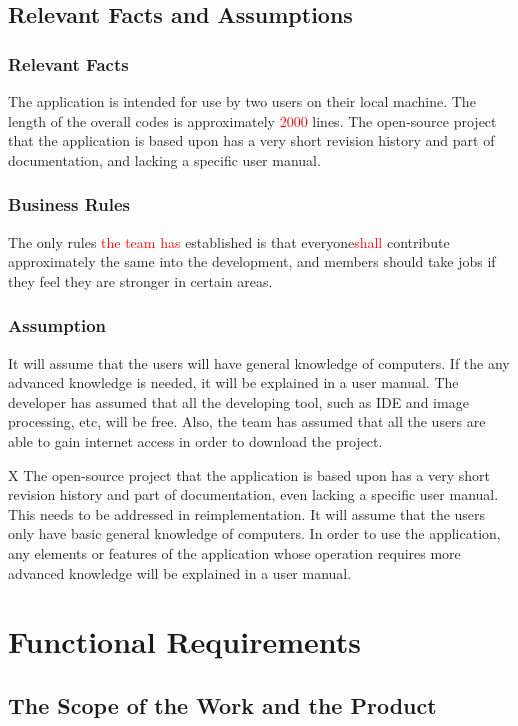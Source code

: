 \documentclass[12pt, titlepage]{article}
\begin{document}
\subsection{Relevant Facts and Assumptions}

\subsubsection{Relevant Facts}
The application is intended for use by two users on their local machine. The length of the overall codes is approximately \textcolor{red}{2000} lines. The open-source project that the application is based upon has a very short revision history and part of documentation, and lacking a specific user manual.

\subsubsection{Business Rules}
The only rules \textcolor{red}{the team has} established is that everyone\textcolor{red}{shall} contribute approximately the same into the development, and members should take jobs if they feel they are stronger in certain areas.

\subsubsection{Assumption}
It will assume that the users will have general knowledge of computers. If the any advanced knowledge is needed, it  will be explained in a user manual. The developer has assumed that all the developing tool, such as IDE and image processing, etc, will be free. Also, the team has assumed that all the users are able to gain internet access in order to download the project.


X The open-source project that the application is based upon has a very short revision history and part of documentation, even lacking a specific user manual. This needs to be addressed in reimplementation. It will assume that the users only have basic general knowledge of computers. In order to use the application, any elements or features of the application whose operation requires more advanced knowledge will be explained in a user manual.

\section{Functional Requirements}

\subsection{The Scope of the Work and the Product}
\end{document}
